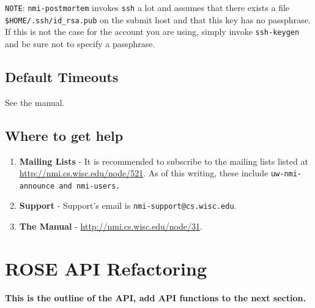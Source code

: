 {\tt NOTE}: {\tt nmi-postmortem} invokes {\tt ssh} a lot and assumes that there
exists a file {\tt \$HOME/.ssh/id\_rsa.pub} on the submit host and that this key
has no passphrase.  If this is not the case for the account you are using,
simply invoke {\tt ssh-keygen} and be sure not to specify a passphrase.


\subsection{Default Timeouts}
   See the manual.


\subsection{Where to get help}

\begin{enumerate}
	\item {\bf Mailing Lists} - It is recommended to subscribe to the mailing
		lists listed at \url{http://nmi.cs.wisc.edu/node/521}.  As of this writing,
		these include \tt{uw-nmi-announce} and \tt{nmi-users}.

	\item {\bf Support} - Support's email is {\tt nmi-support@cs.wisc.edu}.

    \item {\bf The Manual} - \url{http://nmi.cs.wisc.edu/node/31}.
\end{enumerate}



\section{ROSE API Refactoring}

{\bf This is the outline of the API, add API functions to the next section.}

